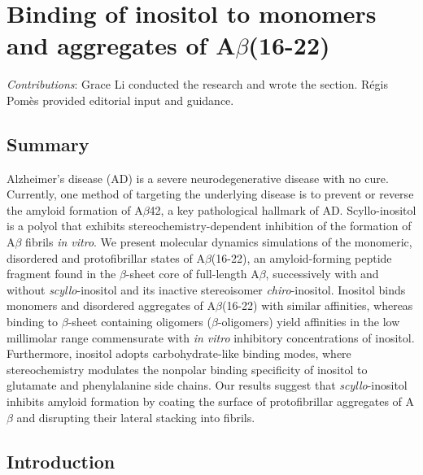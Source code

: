 \chapter{Binding of inositol to monomers and aggregates of A$\beta$(16-22)}

\emph{Contributions}:
Grace Li conducted the research and wrote the section. Régis Pomès provided editorial input and guidance.

\section{Summary}
	Alzheimer's disease (AD) is a severe neurodegenerative disease with no cure. Currently, one method of targeting the underlying disease is to prevent or reverse the amyloid formation of A$\beta$42, a key pathological hallmark of AD. Scyllo-inositol is a polyol that exhibits stereochemistry-dependent inhibition of the formation of A$\beta$ fibrils \emph{in vitro}. We present molecular dynamics simulations of the monomeric, disordered and protofibrillar states of A$\beta$(16-22), an amyloid-forming peptide fragment found in the $\beta$-sheet core of full-length A$\beta$, successively with and without \emph{scyllo}-inositol and its inactive stereoisomer \emph{chiro}-inositol. Inositol binds monomers and disordered aggregates of A$\beta$(16-22) with similar affinities, whereas binding to $\beta$-sheet containing oligomers ($\beta$-oligomers) yield affinities in the low millimolar range commensurate with \emph{\emph{in vitro}} inhibitory concentrations of inositol. Furthermore, inositol adopts carbohydrate-like binding modes, where stereochemistry modulates the nonpolar binding specificity of inositol to glutamate and phenylalanine side chains. Our results suggest that \emph{scyllo}-inositol inhibits amyloid formation by coating the surface of protofibrillar aggregates of A$\beta$ and disrupting their lateral stacking into fibrils.


\section{Introduction}


